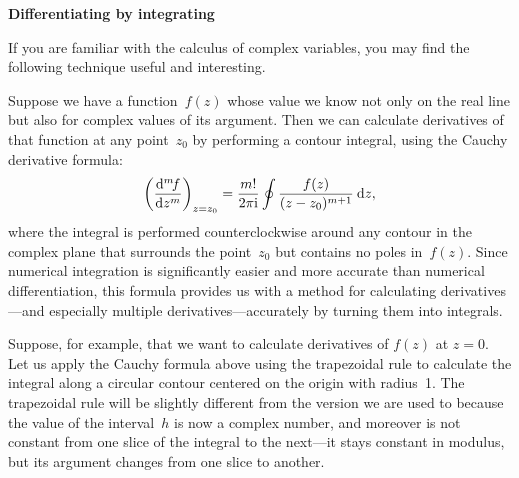 \documentclass[12pt]{article}
\begin{document}
\begin{exercises}

\exercise \textbf{Differentiating by integrating}

\exskip If you are familiar with the calculus of complex variables, you may
find the following technique useful and interesting.

Suppose we have a function~$f(z)$ whose value we know not only on the real
line but also for complex values of its argument.  Then we can calculate
derivatives of that function at any point~$z_0$ by performing a contour
integral, using the Cauchy derivative formula:
\begin{displaymath}
\biggl( {\mathrm{d}^m\!f\over\mathrm{d} z^m} \biggr)_{z=z_0}
  = {m!\over2\pi\mathrm{i}} \oint {f(z)\over(z-z_0)^{m+1}} \>\mathrm{d} z,
\end{displaymath}
where the integral is performed counterclockwise around any contour in the
complex plane that surrounds the point~$z_0$ but contains no poles
in~$f(z)$.  Since numerical integration is significantly easier and more
accurate than numerical differentiation, this formula provides us with a
method for calculating derivatives---and especially multiple
derivatives---accurately by turning them into integrals.

Suppose, for example, that we want to calculate derivatives of $f(z)$ at
$z=0$.  Let us apply the Cauchy formula above using the trapezoidal rule to
calculate the integral along a circular contour centered on the origin with
radius~1.  The trapezoidal rule will be slightly different from the version
we are used to because the value of the interval~$h$ is now a complex
number, and moreover is not constant from one slice of the integral to the
next---it stays constant in modulus, but its argument changes from one
slice to another.


\end{exercises}
\end{document}
